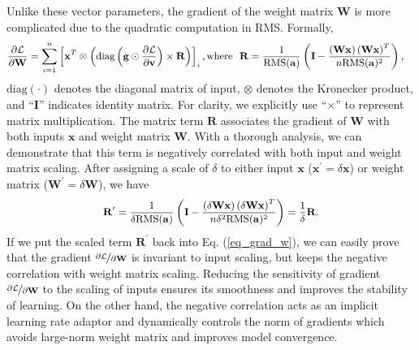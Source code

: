 \documentclass{article}
\begin{document}
Unlike these vector parameters, the gradient of the weight matrix $\mathbf{W}$ is more complicated due to the quadratic computation in RMS. Formally, 
\begin{align}\label{eq_grad_w}
    \small
    \begin{split}
        & \frac{\partial \mathcal{L}}{\partial \mathbf{W}} =
        \sum_{i=1}^n \left[\mathbf{x}^T \otimes \left(\text{diag}\left(\mathbf{g} \odot \frac{\partial \mathcal{L}}{\partial \mathbf{v}} \right) \times \mathbf{R}\right)\right]_{i},  \text{where}~~ \mathbf{R} = \frac{1}{{\text{RMS}(\mathbf{a})}} \left(\mathbf{I}-\frac{\left(\mathbf{Wx}\right)\left(\mathbf{Wx}\right)^T}{n\text{RMS}(\mathbf{a})^2}\right),
    \end{split}
\end{align}
$\text{diag}(\cdot)$ denotes the diagonal matrix of input, $\otimes$ denotes the Kronecker product, and ``$\mathbf{I}$'' indicates identity matrix. For clarity, we explicitly use ``$\times$'' to represent matrix multiplication. The matrix term $\mathbf{R}$ associates the gradient of $\mathbf{W}$ with both inputs $\mathbf{x}$ and weight matrix $\mathbf{W}$. With a thorough analysis, we can demonstrate that this term is negatively correlated with both input and weight matrix scaling. After assigning a scale of $\delta$ to either input $\mathbf{x}$ ($\mathbf{x}^\prime = \delta \mathbf{x}$) or weight matrix ($\mathbf{W}^\prime = \delta \mathbf{W}$), we have
\begin{equation}
    \small
    \begin{split}
        \mathbf{R}^\prime & = \frac{1}{{\delta \text{RMS}(\mathbf{a})}} \left(\mathbf{I}-\frac{\left(\mathbf{\delta Wx}\right)\left(\mathbf{\delta Wx}\right)^T}{n\delta^2 \text{RMS}(\mathbf{a})^2}\right) = \frac{1}{\delta}\mathbf{R}. \\
    \end{split}
\end{equation}
If we put the scaled term $\mathbf{R}^\prime$ back into Eq. (\ref{eq_grad_w}), we can easily prove that the gradient $\nicefrac{\partial \mathcal{L}}{\partial \mathbf{W}}$ is invariant to input scaling, but keeps the negative correlation with weight matrix scaling. Reducing the sensitivity of gradient $\nicefrac{\partial \mathcal{L}}{\partial \mathbf{W}}$ to the scaling of inputs ensures its smoothness and improves the stability of learning. On the other hand, the negative correlation acts as an implicit learning rate adaptor and
dynamically controls the norm of gradients which avoids large-norm weight matrix and improves model convergence.
\end{document}
